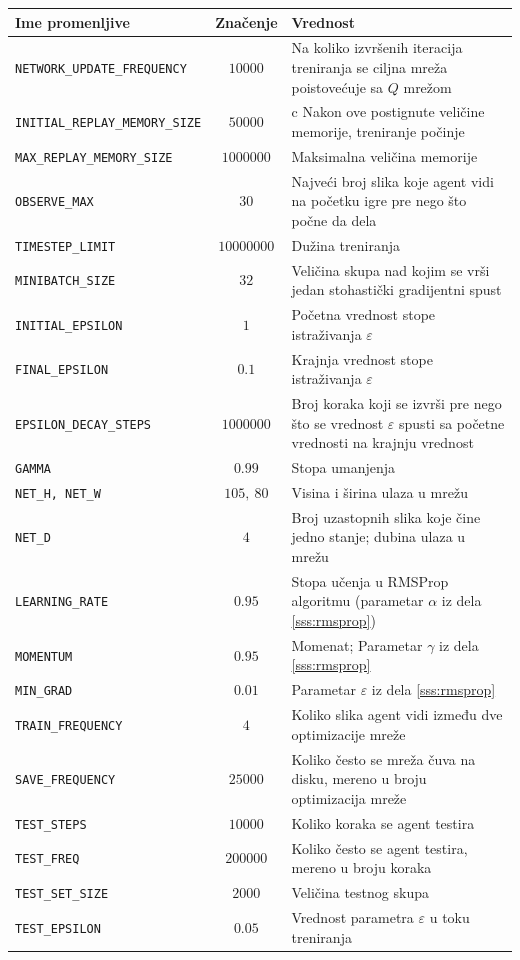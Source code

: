 \begin{table}
{\renewcommand{\arraystretch}{1.2}
 \begin{tabularx}{\textwidth}{|l|c|X|} 
 \hline
 Ime promenljive & Značenje & Vrednost \\ 
 \hline\hline
 \texttt{NETWORK\_UPDATE\_FREQUENCY} & $10000$ & Na koliko izvršenih iteracija treniranja se ciljna mreža poistovećuje sa $Q$ mrežom  \\ 
 \hline
 \texttt{INITIAL\_REPLAY\_MEMORY\_SIZE} & $50000$ & c Nakon ove postignute veličine memorije, treniranje počinje \\
 \hline
 \texttt{MAX\_REPLAY\_MEMORY\_SIZE} & $1000000$ & Maksimalna veličina memorije  \\
 \hline
 \texttt{OBSERVE\_MAX} & $30$ & Najveći broj slika koje agent vidi na početku igre pre nego što počne da dela  \\
 \hline
 \texttt{TIMESTEP\_LIMIT} & $10000000$ & Dužina treniranja  \\
 \hline
 \texttt{MINIBATCH\_SIZE} & $32$ & Veličina skupa nad kojim se vrši jedan stohastički gradijentni spust  \\
 \hline
 \texttt{INITIAL\_EPSILON} & $1$ & Početna vrednost stope istraživanja $\varepsilon$  \\
 \hline
 \texttt{FINAL\_EPSILON} & $0.1$ & Krajnja vrednost stope istraživanja $\varepsilon$  \\
 \hline
 \texttt{EPSILON\_DECAY\_STEPS} & $1000000$ & Broj koraka koji se izvrši pre nego što se vrednost $\varepsilon$ spusti sa početne vrednosti na krajnju vrednost  \\
 \hline
 \texttt{GAMMA} & $0.99$ & Stopa umanjenja  \\
 \hline
 \texttt{NET\_H, NET\_W} & $105,~80$ & Visina i širina ulaza u mrežu  \\
 \hline
 \texttt{NET\_D} & $4$ & Broj uzastopnih slika koje čine jedno stanje; dubina ulaza u mrežu  \\
 \hline
 \texttt{LEARNING\_RATE} & $0.95$ & Stopa učenja u RMSProp algoritmu (parametar $\alpha$ iz dela \ref{sss:rmsprop})  \\
 \hline
 \texttt{MOMENTUM} & $0.95$ & Momenat; Parametar $\gamma$ iz dela \ref{sss:rmsprop}  \\
 \hline
 \texttt{MIN\_GRAD} & $0.01$ & Parametar $\varepsilon$ iz dela \ref{sss:rmsprop}  \\
 \hline
 \texttt{TRAIN\_FREQUENCY} & $4$ & Koliko slika agent vidi između dve optimizacije mreže  \\
 \hline
 \texttt{SAVE\_FREQUENCY} & $25000$ & Koliko često se mreža čuva na disku, mereno u broju optimizacija mreže  \\
 \hline
 \texttt{TEST\_STEPS} & $10000$ & Koliko koraka se agent testira  \\
 \hline
 \texttt{TEST\_FREQ} & $200000$ & Koliko često se agent testira, mereno u broju koraka  \\
 \hline
 \texttt{TEST\_SET\_SIZE} & $2000$ & Veličina testnog skupa  \\
 \hline
 \texttt{TEST\_EPSILON} & $0.05$ & Vrednost parametra $\varepsilon$ u toku treniranja  \\
 \hline


\end{tabularx}}
\end{table}
